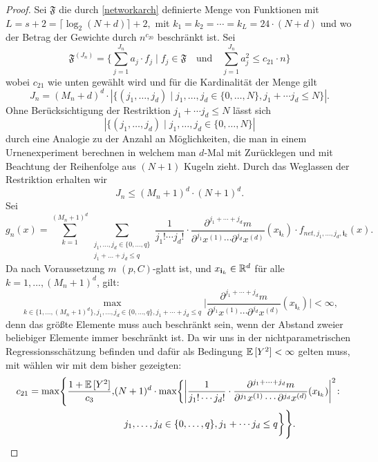 \begin{proof}
Sei $\mathfrak{F}$ die durch \ref{networkarch} definierte Menge von Funktionen mit $L = s + 2 = \lceil\log_2(N + d)\rceil + 2,$ mit $k_1 = k_2 = \cdots = k_L = 24 \cdot (N + d)$ und wo der Betrag der Gewichte durch $n^{c_20}$ beschränkt ist. Sei 
$$ \mathfrak{F}^{(J_n)} = \biggl\{\sum_{j = 1}^{J_n} a_j \cdot f_j \mid f_j \in \mathfrak{F} \quad \text{und} \quad \sum_{j = 1}^{J_n} a_j^2 \leq c_{21} \cdot n \biggr\}$$
wobei $c_{21}$ wie unten gewählt wird und für die Kardinalität der Menge gilt 
$$J_n = (M_n + d)^d \cdot |\{(j_1,\dots,j_d) \mid j_1,\dots,j_d \in \{0,\dots,N\}, j_1 + \cdots j_d \leq N\}|.$$ 
Ohne Berücksichtigung der Restriktion $j_1 + \cdots j_d \leq N$ lässt sich $$|\{(j_1,\dots,j_d) \mid j_1,\dots,j_d \in \{0,\dots,N\}|$$ durch eine Analogie zu der Anzahl an Möglichkeiten, die man in einem Urnenexperiment berechnen in welchem man $d$-Mal mit Zurücklegen und mit Beachtung der Reihenfolge aus $(N + 1)$ Kugeln zieht. Durch das Weglassen der Restriktion erhalten wir 
$$ J_n \leq (M_n + 1)^d \cdot (N + 1)^d.$$
Sei 
$$g_n(x) = \sum_{k = 1}^{(M_n + 1)^d} \sum_{\substack{ j_1,\dots,j_d \in \{0,\dots,q\} \\j_1+\dots +j_d \leq q}} \frac{1}{j_1! \cdots j_d!} \cdot \frac{\partial^{j_1+\cdots + j_d} m}{\partial^{j_1} x^{(1)}\cdots \partial^{j_d} x^{(d)}}(x_{\mathbf{i}_k}) \cdot f_{net,j_1,\dots,j_d,\mathbf{i}_k}(x).$$
Da nach Voraussetzung $m$ $(p,C)$-glatt ist, und $x_{\mathbf{i}_k} \in \mathbb{R}^d$ für alle $k = 1,\dots,(M_n + 1)^d$, gilt$\colon$
\begin{equation}
\label{bound}
\max_{k \in \{1,\dots,(M_n + 1)^d\}, j_1,\dots,j_d \in\{0,\dots,q\}, j_1+\cdots+j_d \leq q} \bigg| \frac{\partial^{j_1+\cdots + j_d} m}{\partial^{j_1} x^{(1)}\cdots \partial^{j_d} x^{(d)}}(x_{\mathbf{i}_k})\bigg| < \infty,
\end{equation}
denn das größte Elemente muss auch beschränkt sein, wenn der Abstand zweier beliebiger Elemente immer beschränkt ist.
Da wir uns in der nichtparametrischen Regressionsschätzung befinden und dafür als Bedingung $\mathbb{E}\,[Y^2] < \infty$ gelten muss, mit wählen wir mit dem bisher gezeigten$\colon$
\begin{equation}
\label{constantc21}
\begin{split}
c_{21} = \max\Biggl\{\frac{1 + \E[Y^2]}{c_3}, & (N + 1)^d \cdot \max\biggl\{\bigg| \frac{1}{j_1! \cdots j_d!} \cdot \frac{\partial^{j_1+\cdots + j_d} m}{\partial^{j_1} x^{(1)}\cdots \partial^{j_d} x^{(d)}}(x_{\mathbf{i}_k})\bigg|^2 \colon \\
& \quad j_1,\dots,j_d \in \{0,\dots,q\}, j_1 + \cdots j_d \leq q\biggr\}\Biggr\}.

\end{split}
\end{equation}
\end{proof}

